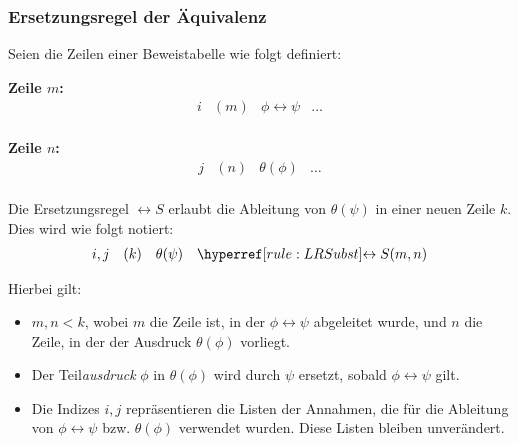 \documentclass[main.tex]{subfiles}
\begin{document}
\subsubsection{Ersetzungsregel der Äquivalenz}
\label{rule:LRSubst}
\begin{definition}
Seien die Zeilen einer Beweistabelle wie folgt definiert:

\textbf{Zeile \(m\):}
\[
\begin{array}{llll}
    i & (m) & \phi \leftrightarrow \psi & \dots \\
\end{array}
\]

\textbf{Zeile \(n\):}
\[
\begin{array}{llll}
    j & (n) & \theta(\phi) & \dots \\
\end{array}
\]

Die Ersetzungsregel \(\leftrightarrow S\) erlaubt die Ableitung von \(\theta(\psi)\) in einer neuen Zeile \(k\). Dies wird wie folgt notiert:
\[
\begin{array}{llll}
    i,j & (k) & \theta(\psi) & \rLRS{m,n} \\
\end{array}
\]

Hierbei gilt:
\begin{itemize}
    \item \(m, n < k\), wobei \(m\) die Zeile ist, in der \(\phi \leftrightarrow \psi\) abgeleitet wurde, und \(n\) die Zeile, in der der Ausdruck \(\theta(\phi)\) vorliegt.
    \item Der Teil\textit{ausdruck} \(\phi\) in \(\theta(\phi)\) wird durch \(\psi\) ersetzt, sobald \(\phi \leftrightarrow \psi\) gilt.
    \item Die Indizes \(i, j\) repräsentieren die Listen der Annahmen, die für die Ableitung von \(\phi \leftrightarrow \psi\) bzw. \(\theta(\phi)\) verwendet wurden. Diese Listen bleiben unverändert.
\end{itemize}
\end{definition}
\end{document}
